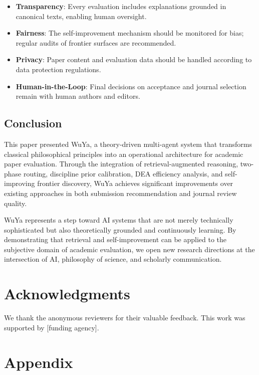 \documentclass[11pt,a4paper]{article}
\newcommand{\dea}{DEA}
\begin{document}
\begin{itemize}
    \item \textbf{Transparency}: Every evaluation includes explanations grounded in canonical texts, enabling human oversight.
    \item \textbf{Fairness}: The self-improvement mechanism should be monitored for bias; regular audits of frontier surfaces are recommended.
    \item \textbf{Privacy}: Paper content and evaluation data should be handled according to data protection regulations.
    \item \textbf{Human-in-the-Loop}: Final decisions on acceptance and journal selection remain with human authors and editors.
\end{itemize}

\subsection{Conclusion}

This paper presented WuYa, a theory-driven multi-agent system that transforms classical philosophical principles into an operational architecture for academic paper evaluation. Through the integration of retrieval-augmented reasoning, two-phase routing, discipline prior calibration, \dea{} efficiency analysis, and self-improving frontier discovery, WuYa achieves significant improvements over existing approaches in both submission recommendation and journal review quality.

WuYa represents a step toward AI systems that are not merely technically sophisticated but also theoretically grounded and continuously learning. By demonstrating that retrieval and self-improvement can be applied to the subjective domain of academic evaluation, we open new research directions at the intersection of AI, philosophy of science, and scholarly communication.

\section*{Acknowledgments}

We thank the anonymous reviewers for their valuable feedback. This work was supported by [funding agency].

\section{Appendix}
\label{sec:appendix}
\end{document}
